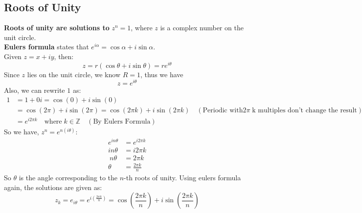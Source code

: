 \documentclass[a4paper, 10pt ]{article} %
\theoremstyle{definition}
\theoremstyle{plain}
\begin{document}
\subsection{Roots of Unity}
\textbf{Roots of unity are solutions to} $z^n = 1$, where $z$ is a complex number on the unit circle.\\
\textbf{Eulers formula} states that $e^{i\alpha} = \cos\alpha + i\sin\alpha$. \\
Given $z = x+ iy$, then:
$$z = r(\cos\theta + i\sin\theta) = re^{i\theta}$$
Since $z$ lies on the unit circle, we know $R =1$, thus we have
$$z = e^{i\theta}$$
Also, we can rewrite $1$ as:
\begin{align*}
  1 & = 1 + 0i = \cos(0) + i\sin(0)                                                                                                             \\
    & = \cos(2\pi) + i\sin(2\pi) = \cos(2\pi k) + i\sin(2\pi k) \quad (\text{Periodic with} 2\pi \; \text{k multiples don't change the result}) \\
    & = e^{i2\pi k} \quad \text{where} \; k \in \mathbb{Z} \quad (\text{By Eulers Formula})
\end{align*}
So we have, $z^n = e^{n(i \theta)}$:
\begin{align*}
  e^{in\theta} & = e^{i2\pi k}      \\
  in\theta     & = i 2\pi k         \\\
  n\theta      & = 2\pi k           \\
  \theta       & = \frac{2\pi k}{n}
\end{align*}
So $\theta$ is the angle corresponding to the $n$-th roots of unity. Using eulers formula again, the solutions are given as:
$$z_k = e_{i\theta} = e^{i(\frac{2\pi k}{n})} = \cos\left(\frac{2\pi k}{n}\right) + i \sin\left(\frac{2\pi k}{n}\right)$$
\end{document}
